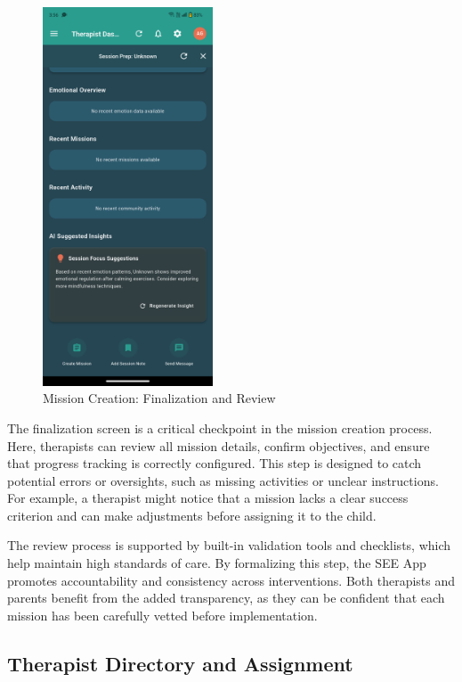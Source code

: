 ﻿\documentclass[12pt,a4paper]{article}
\newcommand{\sectiontitle}[1]{\subsection{#1}}
\begin{document}
\begin{figure}[H]
    \centering
    \includegraphics[width=0.45\textwidth]{Screenshots/restofmissioncreationtherapist.png}
    \caption{Mission Creation: Finalization and Review}
    \label{fig:rest-mission-creation-therapist}
\end{figure}
The finalization screen is a critical checkpoint in the mission creation process. Here, therapists can review all mission details, confirm objectives, and ensure that progress tracking is correctly configured. This step is designed to catch potential errors or oversights, such as missing activities or unclear instructions. For example, a therapist might notice that a mission lacks a clear success criterion and can make adjustments before assigning it to the child.

The review process is supported by built-in validation tools and checklists, which help maintain high standards of care. By formalizing this step, the SEE App promotes accountability and consistency across interventions. Both therapists and parents benefit from the added transparency, as they can be confident that each mission has been carefully vetted before implementation.

\sectiontitle{Therapist Directory and Assignment}
\end{document}
